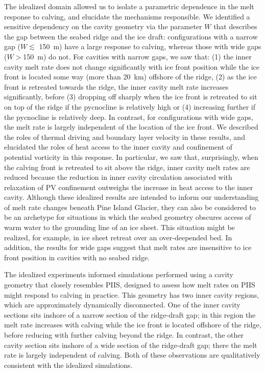 \documentclass[draft]{agujournal2019}
\begin{document}
The idealized domain allowed us to isolate a parametric dependence in the melt response to calving, and elucidate the mechanisms responsible. We identified a sensitive dependency on the cavity geometry via the parameter $W$ that describes the gap between the seabed ridge and the ice draft: configurations with a narrow gap ($W \lesssim$ 150~m) have a large response to calving, whereas those with wide gaps ($W>$150~m) do not. For cavities with narrow gaps, we saw that: (1) the inner cavity melt rate does not change significantly with ice front position while the ice front is located some way (more than 20~km) offshore of the ridge, (2) as the ice front is retreated towards the ridge, the inner cavity melt rate increases significantly, before (3) dropping off sharply when the ice front is retreated to sit on top of the ridge if the pycnocline is relatively high or (4) increasing further if the pycnocline is relatively deep. In contrast, for configurations with wide gaps, the melt rate is largely independent of the location of the ice front. We described the roles of thermal driving and boundary layer velocity in these results, and elucidated the roles of heat access to the inner cavity and confinement of potential vorticity in this response. In particular, we saw that, surprisingly, when the calving front is retreated to sit above the ridge, inner cavity melt rates are reduced because the reduction in inner cavity circulation associated with relaxation of PV confinement outweighs the increase in heat access to the inner cavity. Although these idealized results are intended to inform our understanding of melt rate changes beneath Pine Island Glacier, they can also be considered to be an archetype for situations in which the seabed geometry obscures access of warm water to the grounding line of an ice sheet. This situation might be realized, for example, in ice sheet retreat over an over-deepended bed. In addition, the results for wide gaps suggest that melt rates are insensitive to ice front position in cavities with no seabed ridge.

The idealized experiments informed simulations performed using a cavity geometry that closely resembles PIIS, designed to assess how melt rates on PIIS might respond to calving in practice. This geometry has two inner cavity regions, which are approximately dynamically disconnected. One of the inner cavity sections sits inshore of a narrow section of the ridge-draft gap; in this region the melt rate increases with calving while the ice front is located offshore of the ridge, before reducing with further calving beyond the ridge. In contrast, the other cavity section sits inshore of a wide section of the ridge-draft gap; there the melt rate is largely independent of calving. Both of these observations are qualitatively consistent with the idealized simulations. %
\end{document}

